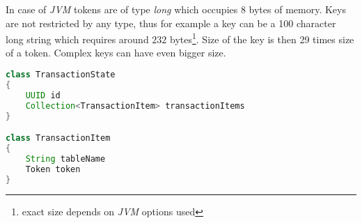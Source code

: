 In case of \emph{JVM} tokens are of type \emph{long} which occupies 8 bytes of memory. Keys are not restricted by any type, thus for example a key can be a 100 character long string which requires around $232$ bytes\footnote{exact size depends on \emph{JVM} options used}. Size of the key is then 29 times size of a token. Complex keys can have even bigger size.

\begin{lstlisting}[language=Java,style=outcode,label={lst:txState},caption={Transaction State data structure}]
class TransactionState
{
    UUID id
    Collection<TransactionItem> transactionItems    
}

class TransactionItem
{
    String tableName
    Token token
}
\end{lstlisting}